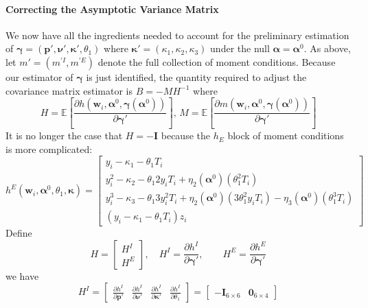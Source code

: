 \documentclass[12pt]{article}
\begin{document}
\paragraph{Correcting the Asymptotic Variance Matrix}
We now have all the ingredients needed to account for the preliminary estimation of $\boldsymbol{\gamma} = (\mathbf{p}', \boldsymbol{\nu}', \boldsymbol{\kappa}', \theta_1)$ where $\boldsymbol{\kappa}' = (\kappa_1, \kappa_2, \kappa_3)$ under the null $\boldsymbol{\alpha} = \boldsymbol{\alpha}^0$.
As above, let $m' = (m^{'I}, m^{'E})$ denote the full collection of moment conditions.
Because our estimator of $\boldsymbol{\gamma}$ is just identified, the quantity required to adjust the covariance matrix estimator is $B = -MH^{-1}$ where 
\[
  H = \mathbb{E}\left[ \frac{\partial h\left(\mathbf{w}_i, \boldsymbol{\alpha}^0, \boldsymbol{\gamma}(\boldsymbol{\alpha}^0)\right)}{\partial \boldsymbol{\gamma}'} \right], \,
  M = \mathbb{E}\left[ \frac{\partial m(\mathbf{w}_i, \boldsymbol{\alpha}^0, \boldsymbol{\gamma}(\boldsymbol{\alpha}^0))}{\partial \boldsymbol{\gamma}'} \right]  
\]
It is no longer the case that $H = -\mathbf{I}$ because the $h_E$ block of moment conditions is more complicated:
\[
  h^E(\mathbf{w}_i, \boldsymbol{\alpha}^0, \theta_1, \boldsymbol{\kappa}) = 
  \left[
  \begin{array}{l}
 y_i - \kappa_1 - \theta_1 T_i\\
  y_i^2 - \kappa_2 - \theta_1 2y_i T_i + \eta_2(\boldsymbol{\alpha}^0) (\theta_1^2 T_i) \\
 y_i^3 - \kappa_3 - \theta_1 3 y_i^2 T_i +  \eta_2(\boldsymbol{\alpha}^0)(3\theta_1^2y_iT_i) -  \eta_3(\boldsymbol{\alpha}^0)(\theta_1^3 T_i)\\
 (y_i - \kappa_1 - \theta_1 T_i)z_i
  \end{array}
\right] 
\]
Define 
\[
  H = \left[
  \begin{array}{c}
    H^I \\ H^E
  \end{array}
\right], 
\quad H^I = \frac{\partial h^I}{\partial \boldsymbol{\gamma}'}, \quad
\quad H^E = \frac{\partial h^E}{\partial \boldsymbol{\gamma}'}
\]
we have
\[
  H^I = \left[
  \begin{array}{cccc}
    \displaystyle \frac{\partial h^I}{\partial \mathbf{p}'} & 
    \displaystyle \frac{\partial h^I}{\partial \boldsymbol{\nu}'} &
    \displaystyle \frac{\partial h^I}{\partial \boldsymbol{\kappa}'} &
    \displaystyle \frac{\partial h^I}{\partial \theta_1}
  \end{array}
\right] = \left[
\begin{array}{cc}
  -\mathbf{I}_{6\times 6} & \mathbf{0}_{6\times 4}
\end{array}
\right]
\]
\end{document}
